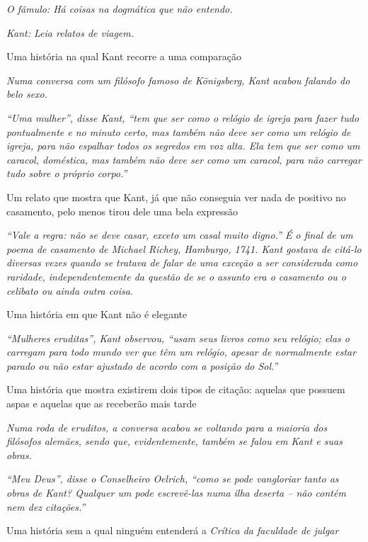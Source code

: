 \emph{O fâmulo: Há coisas na dogmática que não entendo.}

\emph{Kant: Leia relatos de viagem.}\bigskip

Uma história na qual Kant recorre a uma comparação

\emph{Numa conversa com um filósofo famoso de Königsberg, Kant acabou
falando do belo sexo.}

\emph{``Uma mulher'', disse Kant, ``tem que ser como o relógio de igreja
para fazer tudo pontualmente e no minuto certo, mas também não deve ser
como um relógio de igreja, para não espalhar todos os segredos em voz
alta. Ela tem que ser como um caracol, doméstica, mas também não deve
ser como um caracol, para não carregar tudo sobre o próprio corpo.''}\bigskip

Um relato que mostra que Kant, já que não conseguia ver nada de positivo
no casamento, pelo menos tirou dele uma bela expressão

\emph{``Vale a regra: não se deve casar, exceto um casal muito digno.''
É o final de um poema de casamento de Michael Richey, Hamburgo, 1741.
Kant gostava de citá-lo diversas vezes quando se tratava de falar de uma
exceção a ser considerada como raridade, independentemente da questão de se
o assunto era o casamento ou o celibato ou ainda outra coisa.}\bigskip

Uma história em que Kant não é elegante

\emph{``Mulheres eruditas'', Kant observou, ``usam seus livros como seu
relógio; elas o carregam para todo mundo ver que têm um relógio, apesar
de normalmente estar parado ou não estar ajustado de acordo com a
posição do Sol.''}\bigskip

Uma história que mostra existirem dois tipos de citação: aquelas que
possuem aspas e aquelas que as receberão mais tarde

\emph{Numa roda de eruditos, a conversa acabou se voltando para a
maioria dos filósofos alemães, sendo que, evidentemente, também se falou
em Kant e suas obras.}

\emph{``Meu Deus'', disse o Conselheiro Oelrich, ``como se pode
vangloriar tanto as obras de Kant? Qualquer um pode escrevê-las numa
ilha deserta -- não contém nem dez citações.''}\bigskip

Uma história sem a qual ninguém entenderá a \emph{Crítica da faculdade
de julgar}

